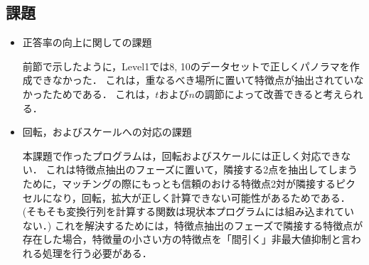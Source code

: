 \subsection{課題}
\begin{itemize}
    \setlength{\itemsep}{5mm}
    \item 正答率の向上に関しての課題\par
    \vspace{1mm}
    \quad
    前節で示したように，Level1では8, 10のデータセットで正しくパノラマを作成できなかった．
    これは，重なるべき場所に置いて特徴点が抽出されていなかったためである．
    これは，$t$および$n$の調節によって改善できると考えられる．
    \item 回転，およびスケールへの対応の課題\par
    \vspace{1mm}
    \quad
    本課題で作ったプログラムは，回転およびスケールには正しく対応できない．
    これは特徴点抽出のフェーズに置いて，隣接する2点を抽出してしまうために，マッチングの際にもっとも信頼のおける特徴点2対が隣接するピクセルになり，回転，拡大が正しく計算できない可能性があるためである．(そもそも変換行列を計算する関数は現状本プログラムには組み込まれていない．)
    これを解決するためには，特徴点抽出のフェーズで隣接する特徴点が存在した場合，特徴量の小さい方の特徴点を「間引く」非最大値抑制と言われる処理を行う必要がある．
\end{itemize}